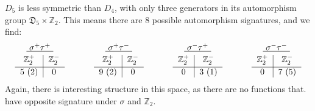 \documentclass[11pt]{article}
\begin{document}
$D_5$ is less symmetric than $D_4$, with only three generators in its automorphism group ${\mathfrak D}_5 \times \mathbb{Z}_2$. This means there are 8 possible automorphism signatures, and we find:
\begin{equation}\label{eq:a2-d5-counts}
\begin{tabular}{ c | c |}
\multicolumn{2}{c}{$\underline{\ \sigma^+ \tau^+\ }$} \\[-1em]
\multicolumn{1}{c}{} & \multicolumn{1}{c}{} \\
 $\mathbb{Z}_2^+$ & \multicolumn{1}{c}{$\mathbb{Z}_2^-$} \\[-1em]
 & \multicolumn{1}{c}{} \\
\hline
5 (2) & \multicolumn{1}{c}{0} 
\end{tabular} 
\hspace{1.2cm}
\begin{tabular}{ c | c |}
\multicolumn{2}{c}{$\underline{\ \sigma^+ \tau^-\ }$} \\[-1em]
\multicolumn{1}{c}{} & \multicolumn{1}{c}{} \\
 $\mathbb{Z}_2^+$ & \multicolumn{1}{c}{$\mathbb{Z}_2^-$} \\[-1em]
 & \multicolumn{1}{c}{} \\
\hline
9 (2) & \multicolumn{1}{c}{0} 
\end{tabular} 
\hspace{1.2cm}
\begin{tabular}{ c | c |}
\multicolumn{2}{c}{$\underline{\ \sigma^- \tau^+ \ }$} \\[-1em]
\multicolumn{1}{c}{} & \multicolumn{1}{c}{} \\
 $\mathbb{Z}_2^+$ & \multicolumn{1}{c}{$\mathbb{Z}_2^-$} \\[-1em]
 & \multicolumn{1}{c}{} \\
\hline
0 & \multicolumn{1}{c}{3 (1)}
\end{tabular} 
\hspace{1.2cm}
\begin{tabular}{ c | c |}
\multicolumn{2}{c}{$\underline{\ \sigma^- \tau^-\ }$} \\[-1em]
\multicolumn{1}{c}{} & \multicolumn{1}{c}{} \\
 $\mathbb{Z}_2^+$ & \multicolumn{1}{c}{$\mathbb{Z}_2^-$} \\[-1em]
 & \multicolumn{1}{c}{} \\
\hline
0 & \multicolumn{1}{c}{7 (5)} \\
\end{tabular} 
\end{equation}
Again, there is interesting structure in this space, as there are no functions that. have opposite signature under $\sigma$ and $\mathbb{Z}_2$.
\end{document}

